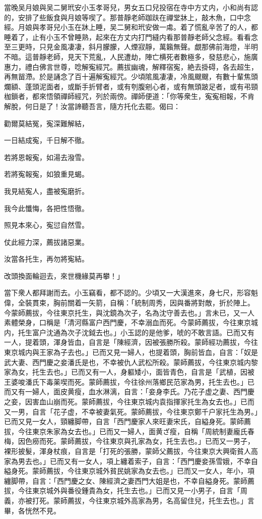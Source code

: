 當晚吴月娘與吴二舅玳安小玉孝哥兒，男女五口兒投宿在寺中方丈内，小和尚有認的，安排了些飯食與月娘等喫了。那普靜老師跏趺在禪堂牀上，敲木魚，口中念經。月娘與孝哥兒小玉在牀上睡，吴二舅和玳安做一䖏。着了慌亂辛苦了的人，都睡着了，止有小玉不曾睡熟，起來在方丈内打門縫内看那普靜老師父念經。看看念至三更時，只見金風凄凄，斜月朦朦，人煙寂靜，萬籟無聲。覷那佛前海燈，半明不暗。這普靜老師，見天下荒亂，人民遭劫，陣亡横死者數極多，發慈悲心，施廣惠力，禮白佛言世尊，唸解寃經咒。薦拔幽魂，解釋宿寃，絶去掛碍，各去超生，再無㽞滯。於是誦念了百十遍解寃經咒。少頃隂風凄凄，冷風颼颼，有數十輩焦頭爛額、蓬頭泥面者，或斷手折臂者，或有刳腹剜心者，或有無頭跛足者，或有弔頸枷鎖者，都來悟領禪師經咒，列於兩傍。禪師便道：「你等衆生，寃寃相報，不肯解脫，何日是了！汝當諦聽吾言，隨方托化去罷。偈曰：
\begin{myquote}
勸爾莫結冤，寃深難解結，

一日結成寃，千日解不徹。

若將恩報寃，如湯去潑雪。

若將寃報寃，如狼重見蝎。

我見結寃人，盡被寃磨折。

我今此懺悔，各把性悟徹。

照見本來心，寃愆自然雪。

仗此經力深，薦拔諸惡業。

汝當各托生，再勿將寃結。

改頭換面輪迴去，來世機緣莫再攀！」
\end{myquote}

當下衆人都拜謝而去。小玉竊看，都不認的。少頃又一大漢進來，身七尺，形容魁偉，全裝貫束，胸前關着一矢箭，自稱：「統制周秀，因與番將對敵，折於陣上。今蒙師薦拔，今往東京托生，與沈鏡為次子，名為沈守善去也。」言未已，又一人素體榮身，口稱是「清河縣富户西門慶，不幸溺血而死。今蒙師薦拔，今往東京城内，托生富户沈通為次子沈鉞去也。」小玉認的是他爹，唬的不敢言語。已而又有一人，提着頭，渾身皆血，自言是「陳經濟，因被張勝所殺。蒙師經功薦拔，今往東京城内與王家為子去也。」已而又見一婦人，也提着頭，胸前皆血，自言：「奴是武大妻、西門慶之妾潘氏是也，不幸被仇人武松所殺。蒙師薦拔，今往東京城内黎家為女，托生去也。」已而又有一人，身軀矮小，面皆青色，自言是「武植，因被王婆唆潘氏下毒薬喫而死。蒙師薦拔，今往徐州落鄉民范家為男，托生去也。」已而又有一婦人，面皮黄瘦，血水淋漓，自言：「妾身李氏。乃花子虚之妻、西門慶之妾，因害血山崩而死。蒙師薦拔，今往東京城内袁指揮家托生為女去也。」已而又一男，自言「花子虚，不幸被妻氣死。蒙師薦拔，今往東京鄭千户家托生為男。」已而又見一女人，頸纏脚帶，自言「西門慶家人來旺妻宋氏，自縊身死。蒙師薦拔，今往東京朱家為女去也。」已而又一婦人，面黄ざ瘦，自稱「周統制妻龐氏春梅，因色癆而死。蒙師薦拔，今往東京與孔家為女，托生去也。」已而又一男子，裸形披髮，渾身杖痕，自言是「打死的張勝，蒙師父薦拔，今往東京大興衛貧人高家為男去也。」已而又有一女人，項上纏着索子，自言：「西門慶妾孫雪娥，不幸自縊身死。蒙師薦拔，今往東京城外貧民姚家為女去也。」已而又一女人，年小，項纏脚帶，自言：「西門慶之女、陳經濟之妻西門大姐是也，不幸自縊身死。蒙師薦拔，今往東京城外與番役鍾貴為女，托生去也。」已而又見一小男子，自言「周義，亦被打死。蒙師薦拔，今往東京城外高家為男，名高留住兒，托生去也。」言畢，各恍然不見。

